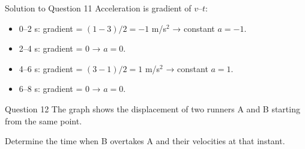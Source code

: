 \documentclass{beamer}
\begin{document}
\begin{frame}[shrink=15]{Solution to Question 11}
Acceleration is gradient of $v$–$t$:
\begin{itemize}
    \item 0–2 s: gradient = $(1-3)/2 = -1$ m/s$^2$ → constant $a=-1$.
    \item 2–4 s: gradient = 0 → $a=0$.
    \item 4–6 s: gradient = $(3-1)/2 = 1$ m/s$^2$ → constant $a=1$.
    \item 6–8 s: gradient = 0 → $a=0$.
\end{itemize}
\begin{center}
\end{center}
\end{frame}

\begin{frame}[shrink=15]{Question 12}
The graph shows the displacement of two runners A and B starting from the same point.
\begin{center}
\end{center}
Determine the time when B overtakes A and their velocities at that instant.
\end{frame}
\end{document}
